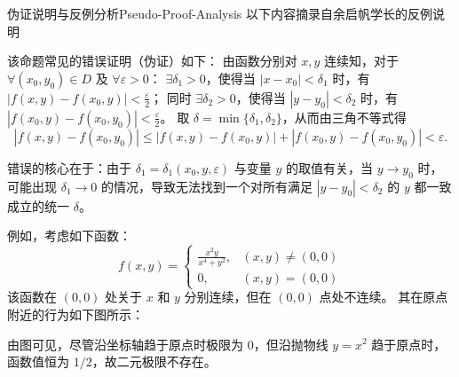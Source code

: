 \begin{note}{伪证说明与反例分析}{Pseudo-Proof-Analysis}
    以下内容摘录自余启帆学长的反例说明 \cite{Yu2021MathAnalysis}

    该命题常见的错误证明（伪证）如下：
    由函数分别对 $x, y$ 连续知，对于 $\forall(x_0, y_0) \in D$ 及 $\forall \varepsilon > 0$：
    $\exists \delta_1 > 0$，使得当 $|x - x_0| < \delta_1$ 时，有 $|f(x, y) - f(x_0, y)| < \frac{\varepsilon}{2}$；
    同时 $\exists \delta_2 > 0$，使得当 $|y - y_0| < \delta_2$ 时，有 $|f(x_0, y) - f(x_0, y_0)| < \frac{\varepsilon}{2}$。
    取 $\delta = \min\{\delta_1, \delta_2\}$，从而由三角不等式得
    \begin{equation}
        |f(x, y) - f(x_0, y_0)| \le |f(x, y) - f(x_0, y)| + |f(x_0, y) - f(x_0, y_0)| < \varepsilon.
    \end{equation}

    错误的核心在于：由于 $\delta_1 = \delta_1(x_0, y, \varepsilon)$ 与变量 $y$ 的取值有关，当 $y \to y_0$ 时，可能出现 $\delta_1 \to 0$ 的情况，导致无法找到一个对所有满足 $|y-y_0|<\delta_2$ 的 $y$ 都一致成立的统一 $\delta$。

    例如，考虑如下函数：
    \begin{equation}
        \boxed{f(x, y) = \begin{cases} \frac{x^2 y}{x^4 + y^2}, & (x, y) \neq (0, 0) \\ 0, & (x, y) = (0, 0) \end{cases}}
    \end{equation}
    该函数在 $(0,0)$ 处关于 $x$ 和 $y$ 分别连续，但在 $(0,0)$ 点处不连续。
    其在原点附近的行为如下图所示：

    \begin{center}
    \end{center}

    由图可见，尽管沿坐标轴趋于原点时极限为 $0$，但沿抛物线 $y = x^2$ 趋于原点时，函数值恒为 $1/2$，故二元极限不存在。
\end{note}



